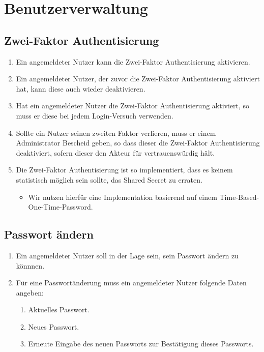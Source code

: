 \documentclass[12pt,DIV14,BCOR10mm,a4paper,parskip=half-,headsepline,headinclude,english,ngerman,bibliography=totocnumbered]{scrreprt}
\begin{document}
\vspace*{-3cm}

\clearpage

\tableofcontents  %

\clearpage

\chapter{Benutzerverwaltung}

\renewcommand*{\chapterheadstartvskip}{\vspace*{22pt}}

\section{Zwei-Faktor Authentisierung}

\begin{enumerate}
    \item Ein angemeldeter Nutzer kann die Zwei-Faktor Authentisierung aktivieren.
    \item Ein angemeldeter Nutzer, der zuvor die Zwei-Faktor Authentisierung aktiviert hat, kann diese auch wieder deaktivieren.
    \item Hat ein angemeldeter Nutzer die Zwei-Faktor Authentisierung aktiviert, so muss er diese bei jedem Login-Versuch verwenden.
    \item Sollte ein Nutzer seinen zweiten Faktor verlieren, muss er einem Administrator Bescheid geben, so dass dieser die Zwei-Faktor Authentisierung deaktiviert, sofern dieser den Akteur für vertrauenswürdig hält.
    \item Die Zwei-Faktor Authentisierung ist so implementiert, dass es keinem statistisch möglich sein sollte, das Shared Secret zu erraten.
    \begin{itemize}
        \item Wir nutzen hierfür eine Implementation basierend auf einem Time-Based-One-Time-Password.
    \end{itemize}
\end{enumerate}

\section{Passwort ändern}

\begin{enumerate}
    \item Ein angemeldeter Nutzer soll in der Lage sein, sein Passwort ändern zu könnnen.
    \item Für eine Passwortänderung muss ein angemeldeter Nutzer folgende Daten angeben:
    \begin{enumerate}
        \item Aktuelles Passwort.
        \item Neues Passwort.
        \item Erneute Eingabe des neuen Passworts zur Bestätigung dieses Passworts.
    \end{enumerate}
\end{enumerate}
\end{document}
